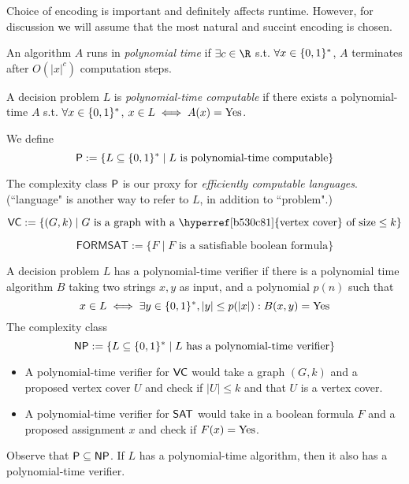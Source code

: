 Choice of encoding is important and definitely affects runtime.
However, for discussion we will assume that the most natural and
succint encoding is chosen.

\label{ee3be28}

An algorithm $A$ runs in \textit{polynomial time} if $\exists c\in\R$
s.t. $\forall x\in\binrep$, $A$ terminates after $O(|x|^c)$
computation steps.

A decision problem $L$ is \textit{polynomial-time computable} if there
exists a polynomial-time $A$ s.t. $\forall x\in\binrep$, $x\in L\iff
	A(x)=\Yes$.

We define
$$
	\P:=\{L\subseteq\binrep\mid L\text{ is polynomial-time computable}\}
$$

The complexity class $\P$ is our proxy for \textit{efficiently
	computable languages}. (``language" is another way to refer to $L$, in
addition to ``problem".)


$$
	\VC:=\{(G,k)\mid G\text{ is a graph with a
		\hyperref[b530c81]{vertex cover} of size}\leq k\}
$$

\label{d6893fe}

$$
	\mathsf{FORMSAT}:=\{F\mid F\text{ is a satisfiable boolean formula}\}
$$

\label{d93050e}

A decision problem $L$ has a polynomial-time verifier if there is a
polynomial time algorithm $B$ taking two strings $x,y$ as input, and a
polynomial $p(n)$ such that
$$
	x\in L\iff\exists y\in\binrep,|y|\leq p(|x|):B(x,y)=\Yes
$$
The complexity class
$$
	\mathsf{NP}:=\{L\subseteq\binrep\mid L\text{ has a polynomial-time verifier}\}
$$

\begin{itemize}
	\item A polynomial-time verifier for $\VC$ would take a graph
	      $(G,k)$ and a proposed vertex cover $U$ and check if $|U|\leq k$
	      and that $U$ is a vertex cover.
	\item A polynomial-time verifier for $\SAT$ would take in a boolean
	      formula $F$ and a proposed assignment $x$ and check if $F(x)=\Yes$.
\end{itemize}

Observe that $\P\subseteq\NP$. If $L$ has a polynomial-time algorithm,
then it also has a polynomial-time verifier.


